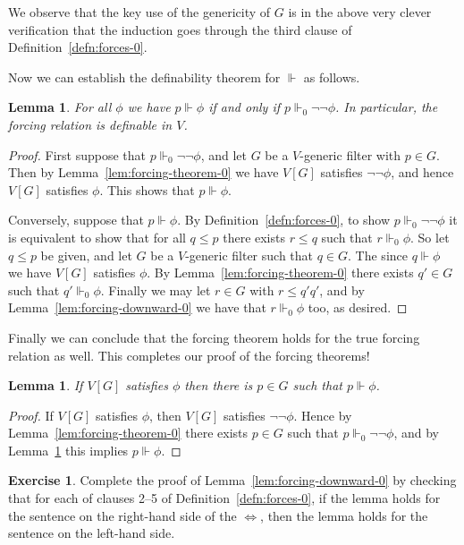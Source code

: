 \documentclass[11pt,oneside,a4paper]{amsbook}
\newcommand{\forces}{\Vdash}
\theoremstyle{definition}
\newtheorem{exercise}{Exercise}[section]
\theoremstyle{plain}
\newtheorem{lemma}[theorem]{Lemma}
\theoremstyle{definition}
\theoremstyle{remark}
\numberwithin{equation}{section}
\numberwithin{figure}{section}
\begin{document}
We observe that the key use of the genericity of $G$ is in the above very clever verification that the induction goes through the third clause of Definition~\ref{defn:forces-0}.

Now we can establish the definability theorem for $\forces$ as follows.

\begin{lemma}
  \label{lem:forcing-definability}
  For all $\phi$ we have $p\forces\phi$ if and only if $p\forces_0\neg\neg\phi$. In particular, the forcing relation is definable in $V$.
\end{lemma}

\begin{proof}
  First suppose that $p\forces_0\neg\neg\phi$, and let $G$ be a $V$-generic filter with $p\in G$. Then by Lemma~\ref{lem:forcing-theorem-0} we have $V[G]$ satisfies $\neg\neg\phi$, and hence $V[G]$ satisfies $\phi$. This shows that $p\forces\phi$.

  Conversely, suppose that $p\forces\phi$. By Definition~\ref{defn:forces-0}, to show $p\forces_0\neg\neg\phi$ it is equivalent to show that for all $q\leq p$ there exists $r\leq q$ such that $r\forces_0\phi$. So let $q\leq p$ be given, and let $G$ be a $V$-generic filter such that $q\in G$. The since $q\forces\phi$ we have $V[G]$ satisfies $\phi$. By Lemma~\ref{lem:forcing-theorem-0} there exists $q'\in G$ such that $q'\forces_0\phi$. Finally we may let $r\in G$ with $r\leq q'q'$, and by Lemma~\ref{lem:forcing-downward-0} we have that $r\forces_0\phi$ too, as desired.
\end{proof}

Finally we can conclude that the forcing theorem holds for the true forcing relation as well. This completes our proof of the forcing theorems!

\begin{lemma}
  If $V[G]$ satisfies $\phi$ then there is $p\in G$ such that $p\forces\phi$.
\end{lemma}

\begin{proof}
  If $V[G]$ satisfies $\phi$, then $V[G]$ satisfies $\neg\neg\phi$. Hence by Lemma~\ref{lem:forcing-theorem-0} there exists $p\in G$ such that $p\forces_0\neg\neg\phi$, and by Lemma~\ref{lem:forcing-definability} this implies $p\forces\phi$.
\end{proof}

\begin{exercise}
  \label{exerc:forcing-downward-clauses-2345}
  Complete the proof of Lemma~\ref{lem:forcing-downward-0} by checking that for each of clauses 2--5 of Definition~\ref{defn:forces-0}, if the lemma holds for the sentence on the right-hand side of the $\iff$, then the lemma holds for the sentence on the left-hand side.
\end{exercise}
\end{document}
